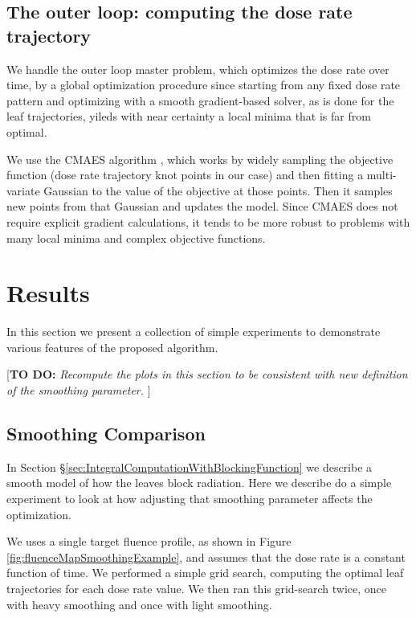 \documentclass[12pt]{article}
\newcommand{\todo}[1]{{\color{lightblue}\par {[{\bf TO DO: } {\em #1}} ] \\    }}
\begin{document}

\subsection{The outer loop: computing the dose rate trajectory}
We handle the outer loop master problem, which optimizes the dose rate over time, by a
global optimization procedure since starting from any fixed dose rate pattern and optimizing with
a smooth gradient-based solver, as is done for the leaf trajectories, yileds with near certainty
a local minima that is far from optimal.

We use the CMAES algorithm \cite{Hansen2001}, which
works by widely sampling the objective function (dose rate trajectory knot points in our case) and then fitting a multi-variate Gaussian to the value of the objective at those points.
Then it samples new points from that Gaussian and updates the model.
Since CMAES does not require explicit gradient calculations, it tends to be more robust to problems
with many local minima and complex objective functions.


\section{Results}

In this section we present a collection of simple experiments to demonstrate various features of the
proposed algorithm.

\todo{Recompute the plots in this section to be consistent with new definition of the smoothing
      parameter.}

\subsection{Smoothing Comparison}
\label{sec:LeafSmoothingComparison}

In Section \S\ref{sec:IntegralComputationWithBlockingFunction} we describe a smooth model of how the leaves block radiation.
Here we describe do a simple experiment to look at how adjusting that smoothing parameter affects the optimization.

We uses a single target fluence profile, as shown in Figure \ref{fig:fluenceMapSmoothingExample},
and assumes that the dose rate is a constant function of time.
We performed a simple grid search, computing the optimal leaf trajectories for each dose rate value.
We then ran this grid-search twice, once with heavy smoothing and once with light smoothing.
\end{document}
